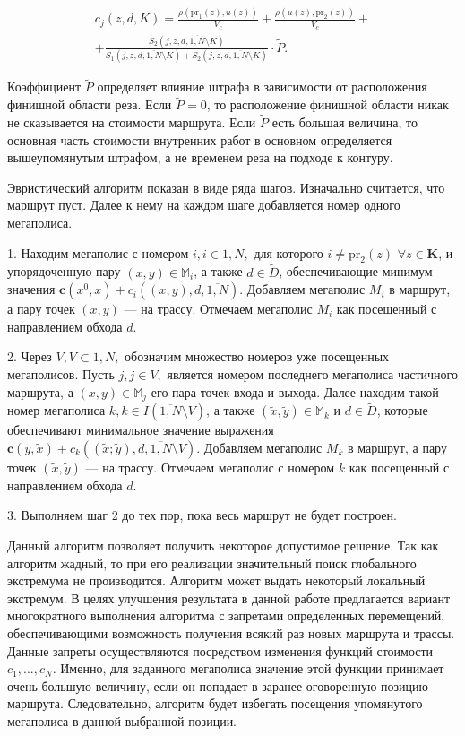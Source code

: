 \documentclass[11pt,twoside,openany]{report}
\begin{document}
{{\begin{equation}\label{IntPrice}
\begin{array}{c}
c_j(z,d,K)=\frac{\rho(\mbox{pr}_1(z),u(z))}{V_c}+
\frac{\rho(u(z),\mbox{pr}_2(z))}{V_c}+\\
+\frac{S_2(j,z,d,\overline{1,N}\setminus K)}{S_1(j,z,d,\overline{1,N}\setminus K)+
S_2(j,z,d,\overline{1,N}\setminus K)}\cdot\tilde{P}.
\end{array}
\end{equation}

Коэффициент $\tilde{P}$ определяет влияние штрафа
в зависимости от расположения финишной области реза. Если
$\tilde{P}=0$, то расположение финишной области никак не
сказывается на стоимости маршрута. Если $\tilde{P}$ есть
большая величина, то основная часть стоимости внутренних
работ в основном определяется вышеупомянутым штрафом, а
не временем реза на подходе к контуру.

Эвристический алгоритм показан в виде ряда шагов.
Изначально считается, что маршрут пуст. Далее к нему на
каждом шаге добавляется номер одного мегаполиса.

1. Находим мегаполис с номером $i,i\in \overline{1,N},$ для которого
$i\neq \mbox{pr}_2(z)$ $\forall z\in \mathbf{K}$, и упорядоченную пару
$(x,y)\in \mathbb{M}_i$, а также $d\in \tilde{D}$,
обеспечивающие минимум значения
$\mathbf{c}(x^0,x)+c_i((x,y),d,\overline{1,N})$.
Добавляем мегаполис $M_i$ в маршрут, а пару точек $(x,y)$ --- на трассу.
Отмечаем мегаполис $M_i$ как посещенный с направлением обхода $d$.

2. Через $V,V\subset \overline{1,N},$ обозначим множество номеров уже
посещенных мегаполисов. Пусть $j,j\in V,$ является номером
последнего мегаполиса частичного маршрута,
а $(x,y)\in \mathbb{M}_j$ его пара точек входа и выхода.
Далее находим такой номер мегаполиса $k,k\in I(\overline{1,N}\setminus V)$,
а также $(\tilde{x},\tilde{y})\in \mathbb{M}_k$ и $d\in \tilde{D}$,
которые обеспечивают минимальное значение выражения
$\mathbf{c}(y,\tilde{x})+c_k((\tilde{x};\tilde{y}),d,\overline{1,N}\setminus V)$.
Добавляем мегаполис $M_k$ в маршрут, а пару точек $(\tilde{x},\tilde{y})$
--- на трассу. Отмечаем мегаполис с номером $k$ как посещенный с направлением
обхода $d$.

3. Выполняем шаг 2 до тех пор, пока весь маршрут не будет построен.

Данный алгоритм позволяет получить некоторое допустимое решение. Так как алгоритм
жадный, то при его реализации значительный поиск глобального экстремума не производится.
Алгоритм может выдать некоторый локальный экстремум. В целях улучшения результата в
данной работе предлагается вариант многократного выполнения алгоритма с запретами
определенных перемещений, обеспечивающими возможность получения всякий раз новых
маршрута и трассы. Данные запреты осуществляются посредством изменения функций
стоимости $c_1,...,c_N$. Именно, для заданного мегаполиса значение этой функции
принимает очень большую величину, если он попадает в заранее оговоренную позицию
маршрута. Следовательно, алгоритм будет избегать посещения упомянутого мегаполиса
в данной выбранной позиции.

}}
\end{document}
